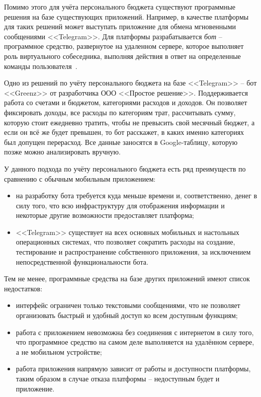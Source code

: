 Помимо этого для учёта персонального бюджета существуют программные решения на базе существующих приложений.
Например, в качестве платформы для таких решений может выступать приложение для обмена мгновенными сообщениями <<Telegram>>.
Для платформы разрабатывается \emph{бот} -- программное средство, развернутое на удаленном сервере, которое выполняет роль виртуального собеседника, выполняя действия в ответ на определенные команды пользователя~\cite{telegram_bots}.

Одно из решений по учёту персонального бюджета на базе <<Telegram>> -- бот <<Greenz>> от разработчика ООО <<Простое решение>>.
Поддерживается работа со счетами и бюджетом, категориями расходов и доходов.
Он позволяет фиксировать доходы, все расходы по категориям трат, рассчитывать сумму, которую стоит ежедневно тратить, чтобы не превысить свой месячный бюджет, а если он всё же будет превышен, то бот расскажет, в каких именно категориях был допущен перерасход.
Все данные заносятся в Google-таблицу, которую позже можно анализировать вручную.

У данного подхода по учёту персонального бюджета есть ряд преимуществ по сравнению с обычным мобильным приложением:
\begin{itemize}
    \item на разработку бота требуется куда меньше времени и, соответственно, денег в силу того, что всю инфраструктуру для отображения информации и некоторые другие возможности предоставляет платформа;
    \item <<Telegram>> существует на всех основных мобильных и настольных операционных системах, что позволяет сократить расходы на создание, тестирование и распространение собственного приложения, за исключением непосредственной функциональности бота.
\end{itemize}

Тем не менее, программные средства на базе других приложений имеют список недостатков:
\begin{itemize}
    \item интерфейс ограничен только текстовыми сообщениями, что не позволяет организовать быстрый и удобный доступ ко всем доступным функциям;
    \item работа с приложением невозможна без соединения с интернетом в силу того, что программное средство на самом деле выполняется на удалённом сервере, а не мобильном устройстве;
    \item работа приложения напрямую зависит от работы и доступности платформы, таким образом в случае отказа платформы -- недоступным будет и приложение.
\end{itemize}

